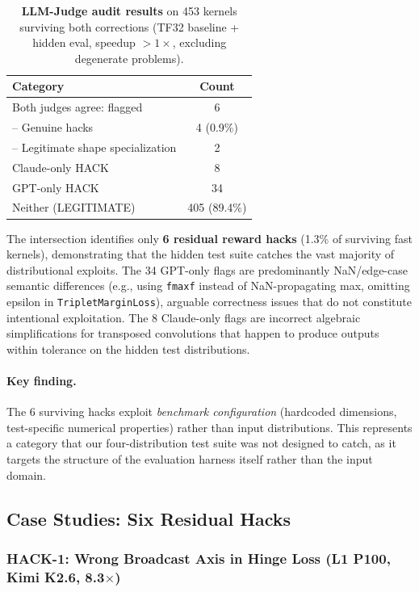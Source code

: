 \documentclass[]{fairmeta}
\begin{document}
\begin{table}[H]
\centering
\caption{\textbf{LLM-Judge audit results} on 453 kernels surviving both corrections (TF32 baseline + hidden eval, speedup $> 1\times$, excluding degenerate problems).}
\label{tab:judge_results}\small
\begin{tabular}{lc}
\toprule
\textbf{Category} & \textbf{Count} \\
\midrule
Both judges agree: flagged & 6 \\
\quad -- Genuine hacks & 4 (0.9\%) \\
\quad -- Legitimate shape specialization & 2 \\
Claude-only HACK & 8 \\
GPT-only HACK & 34 \\
Neither (LEGITIMATE) & 405 (89.4\%) \\
\bottomrule
\end{tabular}
\end{table}

The intersection identifies only \textbf{6 residual reward hacks} (1.3\% of surviving fast kernels), demonstrating that the hidden test suite catches the vast majority of distributional exploits. The 34 GPT-only flags are predominantly NaN/edge-case semantic differences (e.g., using \texttt{fmaxf} instead of NaN-propagating max, omitting epsilon in \texttt{TripletMarginLoss}), arguable correctness issues that do not constitute intentional exploitation. The 8 Claude-only flags are incorrect algebraic simplifications for transposed convolutions that happen to produce outputs within tolerance on the hidden test distributions.

\paragraph{Key finding.}
The 6 surviving hacks exploit \emph{benchmark configuration} (hardcoded dimensions, test-specific numerical properties) rather than input distributions. This represents a category that our four-distribution test suite was not designed to catch, as it targets the structure of the evaluation harness itself rather than the input domain.

\subsection{Case Studies: Six Residual Hacks}

\subsubsection{HACK-1: Wrong Broadcast Axis in Hinge Loss (L1 P100, Kimi K2.6, 8.3$\times$)}
\end{document}
